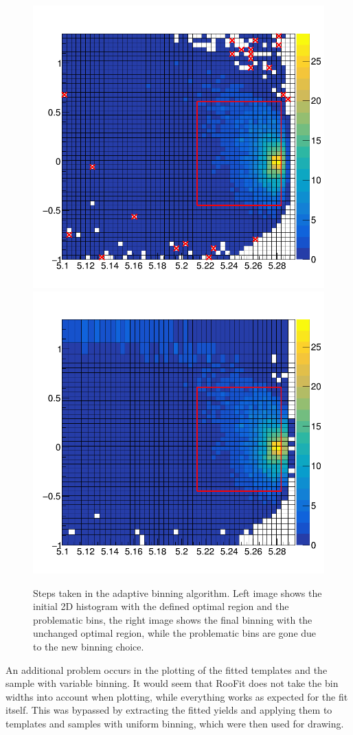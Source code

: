 \begin{figure}[!htbp]
	\centering
	\captionsetup{width=0.8\linewidth}
	\includegraphics[width=0.49\linewidth]{fig/adaptive_1}
	\includegraphics[width=0.49\linewidth]{fig/adaptive_15}
	\caption{Steps taken in the adaptive binning algorithm. Left image shows the initial 2D histogram with the defined optimal region and the problematic bins, the right image shows the final binning with the unchanged optimal region, while the problematic bins are gone due to the new binning choice.}
	\label{fig:adapt}
\end{figure}

An additional problem occurs in the plotting of the fitted templates and the sample with variable binning. It would seem that RooFit does not take the bin widths into account when plotting, while everything works as expected for the fit itself. This was bypassed by extracting the fitted yields and applying them to templates and samples with uniform binning, which were then used for drawing.


